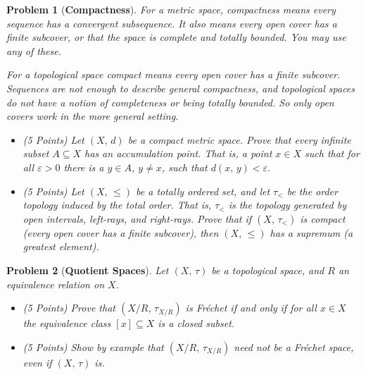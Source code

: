 \documentclass{article}
\theoremstyle{normal}
\newtheorem{problem}{Problem}
\begin{document}
    \begin{problem}[\textbf{Compactness}]
        \par\hfill\par
        For a metric space, compactness means every sequence has a convergent
        subsequence. It also means every open cover has a finite subcover, or
        that the space is complete and totally bounded. You may use any of
        these.
        \par\hfill\par
        For a topological space compact means every open cover has a finite
        subcover. Sequences are not enough to describe general compactness, and
        topological spaces do not have a notion of completeness or being
        totally bounded. So only open covers work in the more general setting.
        \begin{itemize}
            \item (5 Points) Let $(X,\,d)$ be a compact metric space. Prove
                that every infinite subset $A\subseteq{X}$ has an accumulation
                point. That is, a point $x\in{X}$ such that for all
                $\varepsilon>0$ there is a $y\in{A}$, $y\ne{x}$, such that
                $d(x,\,y)<\varepsilon$.
            \item (5 Points) Let $(X,\,\leq)$ be a totally ordered set, and let
                $\tau_{<}$ be the order topology induced by the total order.
                That is, $\tau_{<}$ is the topology generated by open intervals,
                left-rays, and right-rays. Prove that if $(X,\,\tau_{<})$ is
                compact (every open cover has a finite subcover), then
                $(X,\,\leq)$ has a supremum (a greatest element).
        \end{itemize}
    \end{problem}
    \begin{problem}[\textbf{Quotient Spaces}]
        \par\hfill\par
        Let $(X,\,\tau)$ be a topological space, and $R$ an equivalence
        relation on $X$.
        \begin{itemize}
            \item (5 Points) Prove that $(X/R,\,\tau_{X/R})$ is Fr\'{e}chet
                if and only if for all $x\in{X}$ the equivalence class
                $[x]\subseteq{X}$ is a closed subset.
            \item (5 Points) Show by example that $(X/R,\,\tau_{X/R})$ need not
                be a Fr\'{e}chet space, even if $(X,\,\tau)$ is.
        \end{itemize}
    \end{problem}
\end{document}
